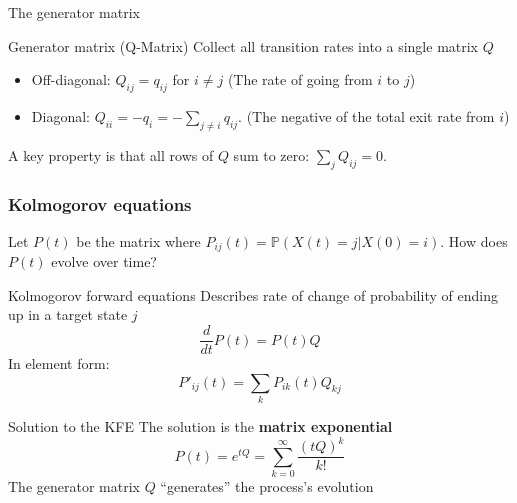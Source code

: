 \documentclass[aspectratio=169]{beamer}\usepackage[]{graphicx}\usepackage[]{xcolor}
\begin{document}
\begin{frame}{The generator matrix}
    \begin{block}{Generator matrix (Q-Matrix)}
        Collect all transition rates into a single matrix $Q$
        \begin{itemize}
            \item Off-diagonal: $Q_{ij} = q_{ij}$ for $i \neq j$ (The rate of going from $i$ to $j$)
            \item Diagonal: $Q_{ii} = -q_i = -\sum_{j \neq i} q_{ij}$. (The negative of the total exit rate from $i$)
        \end{itemize}
        A key property is that all rows of $Q$ sum to zero: $\sum_{j} Q_{ij} = 0$.
    \end{block}
    
\end{frame}


\begin{frame}
    \frametitle{Kolmogorov equations}
    Let $P(t)$ be the matrix where $P_{ij}(t) = \mathbb{P}(X(t)=j | X(0)=i)$. How does $P(t)$ evolve over time?
    \vspace{1em}
    
    \begin{alertblock}{Kolmogorov forward equations}
        Describes rate of change of probability of ending up in a target state $j$
        $$ \frac{d}{dt}P(t) = P(t)Q $$
        In element form:
        $$ P'_{ij}(t) = \sum_{k} P_{ik}(t) Q_{kj} $$
    \end{alertblock}
\end{frame}

\begin{frame}{Solution to the KFE}
        The solution is the \textbf{matrix exponential}
        $$ P(t) = e^{tQ} = \sum_{k=0}^{\infty} \frac{(tQ)^k}{k!} $$
        \vfill
        The generator matrix $Q$ ``generates'' the process's evolution
\end{frame}
\end{document}
